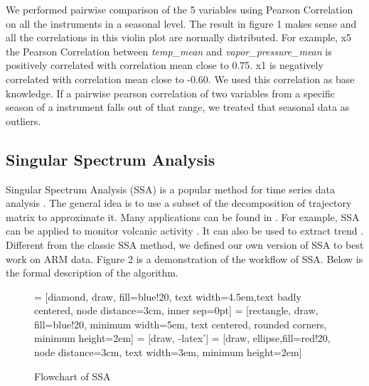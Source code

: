 \documentclass[letterpaper, 10 pt, conference]{ieeeconf}  %
\begin{document}
We performed pairwise comparison of the 5 variables using Pearson Correlation on all the instruments in a seasonal level. The result in figure 1 makes sense and all the correlations in this violin plot are normally distributed. For example, x5 the Pearson Correlation between \textit{temp\_mean} and \textit{vapor\_pressure\_mean} is positively correlated with correlation mean close to 0.75. x1 is negatively correlated with correlation mean close to -0.60. We used this correlation as base knowledge. If a pairwise pearson correlation of two variables from a specific season of a instrument falls out of that range, we treated that seasonal data as outliers.

\subsection{Singular Spectrum Analysis}
Singular Spectrum Analysis (SSA) is a popular method for time series data analysis \cite{golyandina2013singular, golyandina2014basic}. The general idea is to use a subset of the decomposition of trajectory matrix to approximate it. Many applications can be found in \cite{golyandina2013singular}. For example, SSA can be applied to monitor volcanic activity \cite{bozzo2010relationship}. It can also be used to extract trend \cite{alexandrov2008method}. Different from the classic SSA method, we defined our own version of SSA to best work on ARM data. Figure 2 is a demonstration of the workflow of SSA. Below is the formal description of the algorithm.

\begin{figure}[ht]
    \centering
     = [diamond, draw, fill=blue!20, text width=4.5em,text badly centered, node distance=3cm, inner sep=0pt]
     = [rectangle, draw, fill=blue!20, minimum width=5em, text centered, rounded corners, minimum height=2em]
     = [draw, -latex']
     = [draw, ellipse,fill=red!20, node distance=3cm, text width=3em, minimum height=2em]
    \caption{Flowchart of SSA}
    \label{fig:pcs}
\end{figure}
\end{document}

